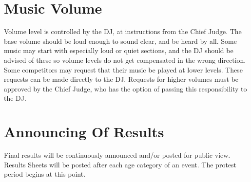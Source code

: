 \section{Music Volume}
Volume level is controlled by the DJ, at instructions from the Chief Judge.
The base volume should be loud enough to sound clear, and be heard by all.
Some music may start with especially loud or quiet sections, and the DJ should be advised of these so volume levels do not get compensated in the wrong direction.
Some competitors may request that their music be played at lower levels.
These requests can be made directly to the DJ.
Requests for higher volumes must be approved by the Chief Judge, who has the option of passing this responsibility to the DJ.

\section{Announcing Of Results}
Final results will be continuously announced and/or posted for public view.
Results Sheets will be posted after each age category of an event.
The protest period begins at this point.

